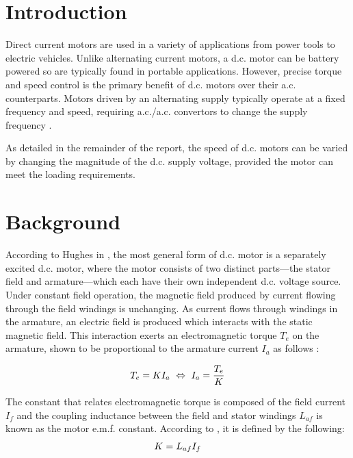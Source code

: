 \documentclass[a4paper,11pt,twocolumn]{article}
\newcommand{\AC}{a.c.\xspace}
\newcommand{\DC}{d.c.\xspace}
\newcommand{\EMF}{e.m.f.\xspace}
\begin{document}
\printnomenclature

\section{Introduction}

Direct current motors are used in a variety of applications from power tools to 
electric vehicles. Unlike alternating current motors, a \DC motor can be 
battery powered so are typically found in portable applications. However, 
precise torque and speed control is the primary benefit of \DC motors over 
their \AC counterparts. Motors driven by an alternating supply typically 
operate at a fixed frequency and speed, requiring \AC/\AC convertors to change 
the supply frequency \cite[p. 787]{hughes2010hughes}.

As detailed in the remainder of the report, the speed of \DC motors can be 
varied by changing the magnitude of the \DC supply voltage, provided the motor 
can meet the loading requirements.

\section{Background} \label{sec:Background}

According to Hughes in \cite[p.~870]{hughes2010hughes}, the most general form 
of \DC motor is a separately excited \DC motor, where the motor consists of two 
distinct parts---the stator field and armature---which each have their own 
independent \DC voltage source. Under constant field operation, the magnetic 
field produced by current flowing through the field windings is unchanging. As 
current flows through windings in the armature, an electric field is produced 
which interacts with the static magnetic field. This interaction exerts an 
electromagnetic torque $T_e$ on the armature, shown to be proportional to the 
armature current $I_a$ as follows \cite[p.~873]{hughes2010hughes}:

\begin{equation}  \label{eq:T}
    T_e = K I_a ~\Leftrightarrow~ I_a = \frac{T_e}{K} \\
\end{equation}

The constant that relates electromagnetic torque is composed of the field 
current $I_f$ and the coupling inductance between the field and stator windings 
$L_{af}$ is known as the motor \EMF constant. According to 
\cite{brigham2016coursework}, it is defined by the following:
\begin{equation} \label{eq:K}
    K = L_{af} I_f \\
\end{equation}
\end{document}
